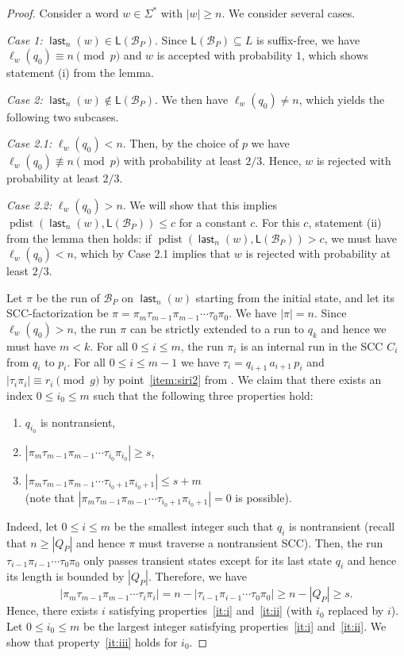 \documentclass{theoretics}
\newcommand{\B}{\mathcal{B}}
\renewcommand{\L}{\mathsf{L}}
\DeclareMathOperator{\last}{\mathsf{last}}
\DeclareMathOperator{\pdist}{pdist}
\renewcommand{\geq}{\geqslant}
\renewcommand{\leq}{\leqslant}
\renewcommand{\ge}{\geq}
\renewcommand{\le}{\leq}
\begin{document}
\begin{proof} Consider a word $w \in \Sigma^*$ with $|w| \ge n$.
We consider several cases.

\medskip\noindent
{\em Case 1:} $\last_n(w) \in \L(\B_P)$. Since $\L(\B_P) \subseteq L$ is suffix-free, we have $\ell_w (q_0) \equiv n \pmod p$ and $w$ is accepted with probability $1$,
which shows statement (i) from the lemma.

\medskip\noindent
{\em Case 2:} $\last_n(w) \notin \L(\B_P)$. We then have $\ell_w (q_0) \neq n$, which yields the following two subcases.

\medskip\noindent
{\em Case 2.1:} $\ell_w(q_0) < n$.
Then, by the choice of $p$ we have $\ell_w(q_0) \not \equiv n \pmod p$ with probability at least $2/3$. 
Hence, $w$ is rejected with probability at least $2/3$.

\medskip\noindent
{\em Case 2.2:}  $\ell_w(q_0) > n$.
We will show that this implies $\pdist(\last_n(w), \L(\B_P)) \le c$ for a constant $c$. 
For this $c$, statement (ii) from the lemma then holds: if $\pdist(\last_n(w), \L(\B_P)) > c$, we must have  
$\ell_w(q_0) < n$, which by Case 2.1 implies that $w$ is rejected with probability at least $2/3$.
 
Let $\pi$ be the run of $\B_P$ on $\last_n(w)$ starting from the initial state,
and let its SCC-factorization be $\pi = \pi_m \tau_{m-1} \pi_{m-1} \cdots \tau_0 \pi_0$. 
We have $|\pi|=n$.
Since $\ell_w(q_0) > n$, the run $\pi$ can be strictly extended to a run to $q_k$ and hence we must have $m < k$. 
For all $0 \leq i \leq m$, the run $\pi_i$ is an internal run in the SCC $C_i$ from $q_i$ to $p_i$.
For all $0 \le i \le m-1$ we have $\tau_i = q_{i+1} \, a_{i+1}\, p_i$  and $|\tau_i \pi_i| \equiv r_i \pmod g$
by point~\ref{item:siri2} from .
We claim that there exists an index $0 \le i_0 \le m$ such that the following three properties hold:
\begin{enumerate}[ref=(\arabic{*})]
\item \label{it:i} $q_{i_0}$ is nontransient,
\item \label{it:ii} $|\pi_m \tau_{m-1} \pi_{m-1} \cdots \tau_{i_0} \pi_{i_0}| \ge s$,
\item \label{it:iii} $|\pi_m \tau_{m-1} \pi_{m-1} \cdots \tau_{{i_0}+1} \pi_{{i_0}+1}| \le s + m$ \\
(note that $|\pi_m \tau_{m-1} \pi_{m-1} \cdots \tau_{{i_0}+1} \pi_{{i_0}+1}| = 0$ is possible).
\end{enumerate}
Indeed, let $0 \le i \le m$ be the smallest integer such that $q_i$ is nontransient
(recall that $n \ge |Q_P|$ and hence $\pi$ must traverse a nontransient SCC).
Then, the run $\tau_{i-1} \pi_{i-1} \cdots \tau_0 \pi_0$ only passes transient states except for 
its last state $q_i$ and hence its length is bounded by $|Q_P|$.
Therefore, we have
\[
	|\pi_m \tau_{m-1} \pi_{m-1} \cdots \tau_i \pi_i| = n - |\tau_{i-1} \pi_{i-1} \cdots \tau_0 \pi_0| \ge n-|Q_P| \ge s.
\]
Hence, there exists $i$ satisfying properties~\ref{it:i} and~\ref{it:ii} (with $i_0$ replaced by $i$).
Let $0 \le {i_0} \le m$ be the largest integer satisfying properties~\ref{it:i} and~\ref{it:ii}.
We show that property~\ref{it:iii} holds for $i_0$.


\end{proof}
\end{document}
